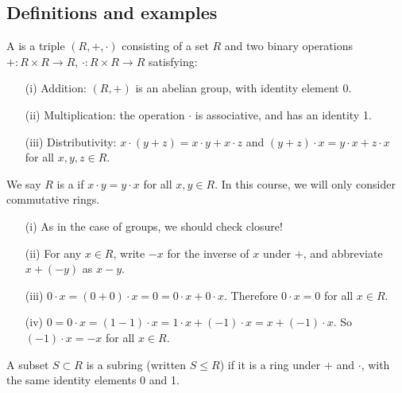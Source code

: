 \documentclass[a4paper]{scrartcl}
\begin{document}
\subsection{Definitions and examples}
\begin{definition*}[Ring]
       A  is a triple $(R, +, \cdot )$ consisting of a set $R$ and two binary operations $+: R \times R \rightarrow R$, $\cdot  : R \times R \rightarrow R$ satisfying: 
       \begin{itemize}
             \item[(i)] Addition: $(R,+)$ is an abelian group, with identity element 0.
             \item[(ii)] Multiplication: the operation $\cdot $ is associative, and has an identity 1.
             \item[(iii)] Distributivity: $x \cdot  (y+z)= x \cdot y + x \cdot  z$ and $(y +z) \cdot  x=y \cdot x +z \cdot  x $ for all $x,y,z \in R$.
       \end{itemize}
       We say $R$ is a  if $x \cdot  y= y \cdot  x$ for all $x,y \in R$. In this course, we will only consider commutative rings.
\end{definition*}
\begin{remarks}\leavevmode
       \begin{itemize}
             \item[(i)] As in the case of groups, we should check closure!
             \item[(ii)] For any $x \in R$, write $-x$ for the inverse of $x$ under $+$, and abbreviate $x+ (-y)$ as $x-y$.
             \item[(iii)] $0 \cdot x= (0+0)\cdot x=0=0 \cdot x+ 0 \cdot x $. Therefore $0 \cdot x=0$ for all $x \in R$.
             \item[(iv)] $0=0 \cdot  x=(1-1) \cdot  x= 1 \cdot x + (-1) \cdot x=x+ (-1)\cdot x$. So $(-1)\cdot  x=-x$ for all $x \in R$.
       \end{itemize}
\end{remarks}
\begin{definition*}[Subring]
       A subset $S \subset R$ is a subring (written $S \leq R$) if it is a ring under $+$ and $\cdot $, with the same identity elements 0 and 1.
\end{definition*}
\end{document}
